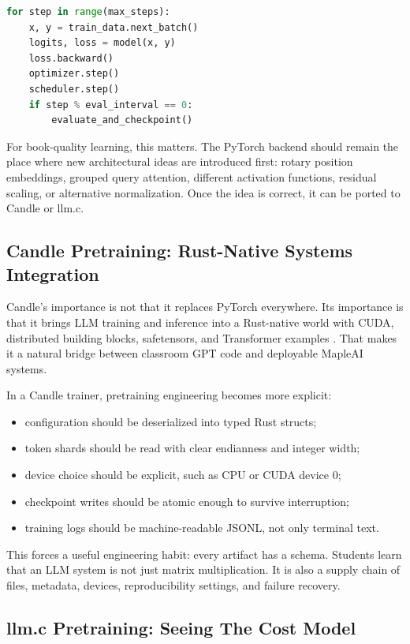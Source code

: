 \begin{lstlisting}[language=Python]
for step in range(max_steps):
    x, y = train_data.next_batch()
    logits, loss = model(x, y)
    loss.backward()
    optimizer.step()
    scheduler.step()
    if step % eval_interval == 0:
        evaluate_and_checkpoint()
\end{lstlisting}

For book-quality learning, this matters. The PyTorch backend should remain the place
where new architectural ideas are introduced first: rotary position embeddings, grouped
query attention, different activation functions, residual scaling, or alternative
normalization. Once the idea is correct, it can be ported to Candle or llm.c.

\subsection{Candle Pretraining: Rust-Native Systems Integration}

Candle's importance is not that it replaces PyTorch everywhere. Its importance is that
it brings LLM training and inference into a Rust-native world with CUDA, distributed
building blocks, safetensors, and Transformer examples \cite{huggingfacecandle}. That
makes it a natural bridge between classroom GPT code and deployable MapleAI systems.

In a Candle trainer, pretraining engineering becomes more explicit:

\begin{itemize}
  \item configuration should be deserialized into typed Rust structs;
  \item token shards should be read with clear endianness and integer width;
  \item device choice should be explicit, such as CPU or CUDA device \(0\);
  \item checkpoint writes should be atomic enough to survive interruption;
  \item training logs should be machine-readable JSONL, not only terminal text.
\end{itemize}

This forces a useful engineering habit: every artifact has a schema. Students learn that
an LLM system is not just matrix multiplication. It is also a supply chain of files,
metadata, devices, reproducibility settings, and failure recovery.

\subsection{llm.c Pretraining: Seeing The Cost Model}

